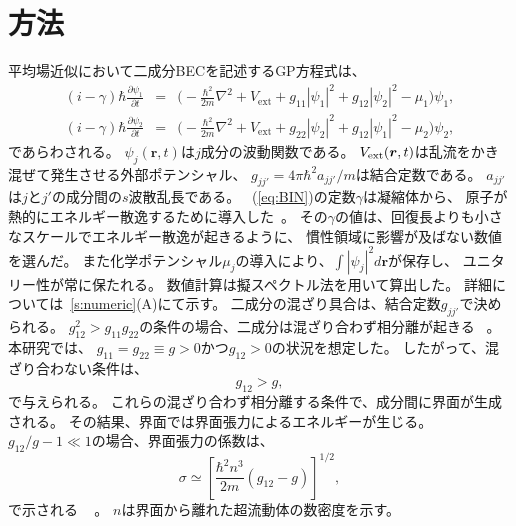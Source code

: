 \documentclass[12pt,a4paper]{jbook}
\begin{document}
		\section{方法}
        \label{s:twocomp}
		平均場近似において二成分BECを記述するGP方程式は、
        \begin{subequations}
        \label{eq:BIN}
        \begin{eqnarray}
			(i - \gamma)\hbar \frac{\partial \psi_1}{\partial t} & = & 
			\biggl(
				-\frac{\hbar^2}{2m}\nabla^2 + V_{\textrm{ext}}
				+ g_{11}|\psi_1|^2 + g_{12}|\psi_2|^2 - \mu_1
			 \biggr) \psi_1,
			\\
			(i - \gamma)\hbar \frac{\partial \psi_2}{\partial t} & = & 
			\biggl(
				-\frac{\hbar^2}{2m}\nabla^2 + V_{\textrm{ext}}
				+ g_{22}|\psi_2|^2 + g_{12}|\psi_1|^2 - \mu_2
			\biggr)\psi_2,
        \end{eqnarray}
        \end{subequations}
        であらわされる。
        $\psi_j(\bm{r}, t)$は$j$成分の波動関数である。
        $V_{\rm ext}(\bm{r}, t)$は乱流をかき混ぜて発生させる外部ポテンシャル、
        $g_{jj'} = 4 \pi \hbar^2 a_{jj'} / m$は結合定数である。
        $a_{jj'}$は$j$と$j'$の成分間の$s$波散乱長である。
        ~(\ref{eq:BIN})の定数$\gamma$は凝縮体から、
        原子が熱的にエネルギー散逸するために導入した~\cite{Choi}。
        その$\gamma$の値は、回復長よりも小さなスケールでエネルギー散逸が起きるように、
        慣性領域に影響が及ばない数値を選んだ。
        また化学ポテンシャル$\mu_j$の導入により、$\int |\psi_j|^2 d\bm{r}$が保存し、
        ユニタリー性が常に保たれる。
        数値計算は擬スペクトル法を用いて算出した。
        詳細については~\ref{s:numeric}(A)にて示す。
        二成分の混ざり具合は、結合定数$g_{jj'}$で決められる。
        $g_{12}^2 > g_{11} g_{22}$の条件の場合、二成分は混ざり合わず相分離が起きる
        ~\cite{Pethick}。
        本研究では、
        $g_{11} = g_{22} \equiv g > 0$かつ$g_{12} > 0$の状況を想定した。
        したがって、混ざり合わない条件は、
        \begin{equation} \label{im}
            g_{12} > g,
        \end{equation}
        で与えられる。
        これらの混ざり合わず相分離する条件で、成分間に界面が生成される。
        その結果、界面では界面張力によるエネルギーが生じる。
        $g_{12} / g - 1 \ll 1$の場合、界面張力の係数は、
        \begin{equation} \label{sigma}
            \sigma \simeq \left[ \frac{\hbar^2 n^3}{2m} (g_{12} - g) \right]^{1/2},
        \end{equation}
        で示される
        ~\cite{Ao, Barankov, Schae}
        。
        $n$は界面から離れた超流動体の数密度を示す。
\end{document}
